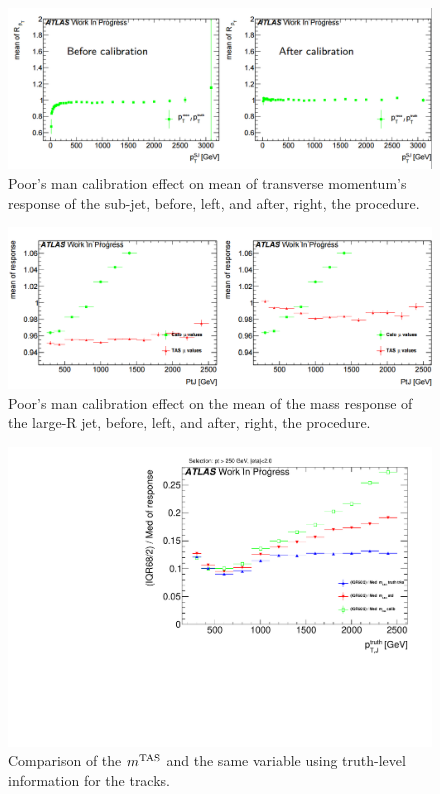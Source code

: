 \begin{figure}[!ht]
  \centering
      \includegraphics[width=\textwidth]{jet_part/calib/perfectcalib2.png}
  \caption{Poor's man calibration effect on mean of transverse momentum's response of the sub-jet, before, left, and after, right, the procedure.}
  \label{fig:calibA}
\end{figure}

\begin{figure}[!ht]
  \centering
      \includegraphics[width=\textwidth]{jet_part/calib/perfectcalib3.png}
  \caption{Poor's man calibration effect on the mean of the mass response of the large-R jet, before, left, and after, right, the procedure.}
  \label{fig:calibA2}
\end{figure}


\begin{figure}[!ht]
  \centering
      \includegraphics[width=\textwidth]{jet_part/calib/71graphcftr_h_JetRatio_mJ12CALOIQRoMcalib_degradW.pdf}
  \caption{Comparison of the $m^\textrm{TAS}$ and the same variable using truth-level information for the tracks.}
  \label{fig:breakdown1}
\end{figure}
